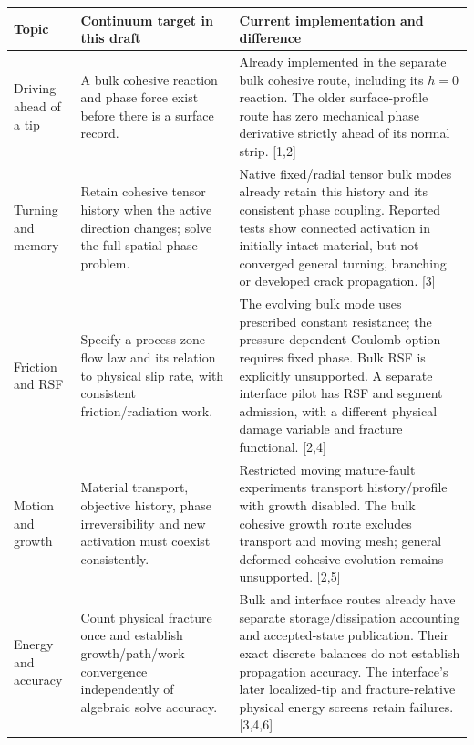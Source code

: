 \documentclass[10pt,a4paper]{article}
\begin{document}
\renewcommand{\arraystretch}{1.08}
\begin{tabularx}{\linewidth}{@{}>{\raggedright\arraybackslash}p{.18\linewidth}
 >{\raggedright\arraybackslash}p{.31\linewidth}
 >{\raggedright\arraybackslash}X@{}}
\toprule
Topic & Continuum target in this draft & Current implementation and difference\\
\midrule
Driving ahead of a tip & A bulk cohesive reaction and phase force exist before
there is a surface record. & Already implemented in the separate bulk cohesive
route, including its $h=0$ reaction. The older surface-profile route has zero
mechanical phase derivative strictly ahead of its normal strip. [1,2]\\
\addlinespace
Turning and memory & Retain cohesive tensor history when the active direction
changes; solve the full spatial phase problem. & Native fixed/radial tensor
bulk modes already retain this history and its consistent phase coupling.
Reported tests show connected activation in initially intact material, but
not converged general turning, branching or developed crack propagation. [3]\\
\addlinespace
Friction and RSF & Specify a process-zone flow law and its relation to physical
slip rate, with consistent friction/radiation work. & The evolving bulk mode
uses prescribed constant resistance; the pressure-dependent Coulomb option
requires fixed phase. Bulk RSF is explicitly unsupported. A separate interface
pilot has RSF and segment admission, with a different physical damage variable
and fracture functional. [2,4]\\
\addlinespace
Motion and growth & Material transport, objective history, phase irreversibility
and new activation must coexist consistently. & Restricted moving mature-fault
experiments transport history/profile with growth disabled. The bulk cohesive
growth route excludes transport and moving mesh; general deformed cohesive
evolution remains unsupported. [2,5]\\
\addlinespace
Energy and accuracy & Count physical fracture once and establish growth/path/work
convergence independently of algebraic solve accuracy. & Bulk and interface
routes already have separate storage/dissipation accounting and accepted-state
publication. Their exact discrete balances do not establish propagation
accuracy. The interface's later localized-tip and fracture-relative physical
energy screens retain failures. [3,4,6]\\
\bottomrule
\end{tabularx}
\end{document}
